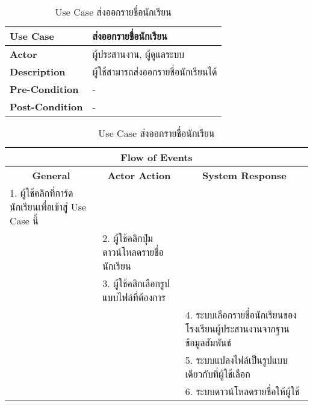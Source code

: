 \begin{table}[H]
    \caption{Use Case ส่งออกรายชื่อนักเรียน}
    \label{tab:usecase-export-student}
    \begin{tabularx}{\textwidth}{ | p{3cm} | X | }
    \hline
    \textbf{Use Case} & ส่งออกรายชื่อนักเรียน \\
    \hline
    \textbf{Actor} & ผู้ประสานงาน, ผู้ดูแลระบบ \\
    \hline
    \textbf{Description} & ผู้ใช้สามารถส่งออกรายชื่อนักเรียนได้ \\
    \hline
    \textbf{Pre-Condition} & - \\
    \hline
    \textbf{Post-Condition} & - \\
    \hline
    \end{tabularx}
    \begin{tabularx}{\textwidth}{ | X | X | X | }
    \multicolumn{3}{|c|}{\textbf{Flow of Events}} \\
    \hline
    \multicolumn{1}{|c|}{\textbf{General}} & \multicolumn{1}{|c|}{\textbf{Actor Action}} & \multicolumn{1}{|c|}{\textbf{System Response}} \\
    \hline
    1. ผู้ใช้คลิกที่การ์ดนักเรียนเพื่อเข้าสู่ Use Case นี้ &  &  \\
    \hline
    & 2. ผู้ใช้คลิกปุ่มดาวน์โหลดรายชื่อนักเรียน  &  \\
    \hline
    & 3. ผู้ใช้คลิกเลือกรูปแบบไฟล์ที่ต้องการ  &  \\
    \hline
    & & 4. ระบบเลือกรายชื่อนักเรียนของโรงเรียนผู้ประสานงานจากฐานข้อมูลสัมพันธ์ \\
    \hline
    & & 5. ระบบแปลงไฟล์เป็นรูปแบบเดียวกับที่ผู้ใช้เลือก \\
    \hline
    & & 6. ระบบดาวน์โหลดรายชื่อให้ผู้ใช้ \\
    \hline
    \end{tabularx}
\end{table}
